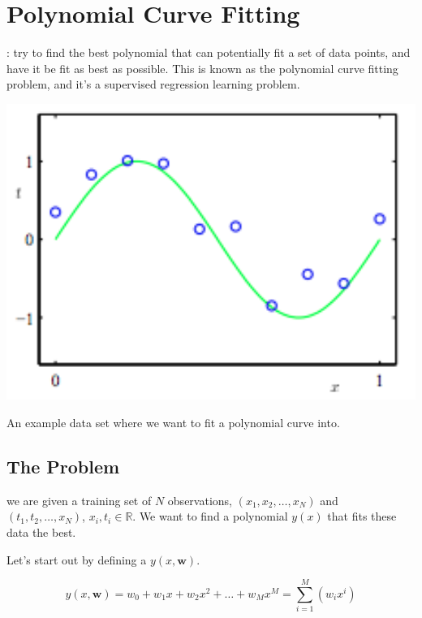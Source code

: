 \documentclass{tufte-handout}
\begin{document}
\section{Polynomial Curve Fitting}\label{sec:polynomial-curve-fitting}

: try to find the best polynomial that can potentially fit a set of data points, and have it be fit as best as possible. This is known as the polynomial curve fitting problem, and it's a supervised regression learning problem.

\begin{marginfigure}
  \includegraphics[width=\linewidth]{curvefitting.png}
  \caption{An example data set where we want to fit a polynomial curve into.}
\end{marginfigure}

\subsection{The Problem}\label{sec:headings}

 we are given a training set of $N$ observations, $(x_{1}, x_{2}, \ldots, x_{N})$ and $(t_{1}, t_{2}, \ldots, x_{N})$, $x_{i}, t_{i} \in \mathbb{R}$. We want to find a polynomial $y(x)$ that fits these data the best.

Let's start out by defining a $y(x, \mathbf{w})$.

\begin{equation}
  y(x, \mathbf{w}) = w_0 + w_1x + w_2x^2 + \ldots + w_Mx^M = \sum\limits_{i = 1}^M(w_ix^i)
\end{equation}
\end{document}
